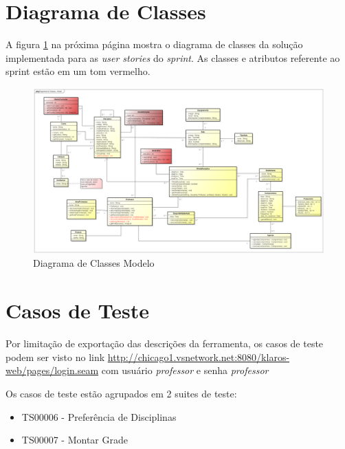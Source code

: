 \documentclass{abnt}
\begin{document}
		
	\clearpage
	
	
		\section{Diagrama de Classes}
		
			A figura \ref{fig:DiagramaClassesModelo} na próxima página mostra o diagrama de classes da solução implementada para as \emph{user stories} do \emph{sprint}. As classes e atributos referente ao sprint estão em um tom vermelho.
			
					 \begin{landscape}
					 			\begin{figure}[htp]
					 				\begin{center}
					 					 \includegraphics[width=600px]{DiagramaClassesModelo}
					 					 \caption{Diagrama de Classes Modelo}
					 					 \label{fig:DiagramaClassesModelo}
					 				\end{center}
					 			\end{figure}
					 		\end{landscape}
			
	
		\section{Casos de Teste}
		
		 Por limitação de exportação das descrições da ferramenta, os casos de teste podem ser visto no link \url{http://chicago1.vsnetwork.net:8080/klaros-web/pages/login.seam} com usuário \emph{professor} e senha \emph{professor}
		 
		 Os casos de teste estão agrupados em 2 suites de teste:
		 \begin{itemize}
		 \item TS00006 - Preferência de Disciplinas
		 \item TS00007 - Montar Grade
		 \end{itemize}
		 
\end{document}
